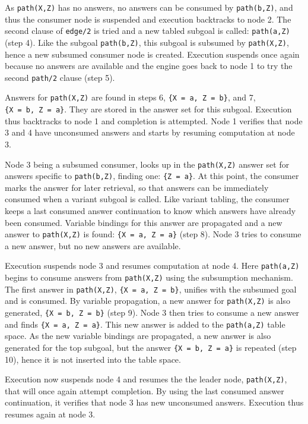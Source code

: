 As \texttt{path(X,Z)} has no answers, no answers can be consumed by \texttt{path(b,Z)}, and thus the consumer
node is suspended and execution backtracks to node 2. The second clause of \texttt{edge/2} is tried and a new tabled
subgoal is called: \texttt{path(a,Z)} (step 4). Like the subgoal \texttt{path(b,Z)}, this subgoal is subsumed by \texttt{path(X,Z)},
hence a new subsumed consumer node is created. Execution suspends once again because no answers are available and
the engine goes back to node 1 to try the second \texttt{path/2} clause (step 5).

Answers for \texttt{path(X,Z)} are found in steps 6, \texttt{\{X~=~a,~Z~=~b\}}, and 7, \texttt{\{X~=~b,~Z~=~a\}}.
They are stored in the answer set for this subgoal. Execution thus backtracks to node 1 and completion
is attempted. Node 1 verifies that node 3 and 4 have unconsumed answers and starts by resuming computation at node 3.

Node 3 being a subsumed consumer, looks up in the \texttt{path(X,Z)} answer set for answers specific to \texttt{path(b,Z)},
finding one: \texttt{\{Z~=~a\}}. At this point, the consumer marks the answer for later retrieval, so that answers can be
immediately consumed when a variant subgoal is called. Like variant tabling, the consumer keeps a last consumed answer
continuation to know which answers have already been consumed. Variable bindings for this answer are propagated and a
new answer to \texttt{path(X,Z)} is found: \texttt{\{X~=~a,~Z~=~a\}} (step 8). Node 3 tries to consume a new answer, but no
new answers are available.

Execution suspends node 3 and resumes computation at node 4. Here \texttt{path(a,Z)} begins to consume answers from
\texttt{path(X,Z)} using the subsumption mechanism. The first answer in \texttt{path(X,Z)}, \texttt{\{X~=~a,~Z~=~b\}},
unifies with the subsumed goal and is consumed. By variable propagation, a new answer for \texttt{path(X,Z)} is also
generated, \texttt{\{X~=~b,~Z~=~b\}} (step 9). Node 3 then tries to consume a new answer and finds \texttt{\{X~=~a,~Z~=~a\}}.
This new answer is added to the \texttt{path(a,Z)} table space. As the new variable bindings are propagated, a new
answer is also generated for the top subgoal, but the answer \texttt{\{X~=~b,~Z~=~a\}} is repeated (step 10), hence it
is not inserted into the table space.

Execution now suspends node 4 and resumes the the leader node, \texttt{path(X,Z)}, that will once
again attempt completion. By using the last consumed answer continuation, it verifies that node 3 has
new unconsumed answers. Execution thus resumes again at node 3.

